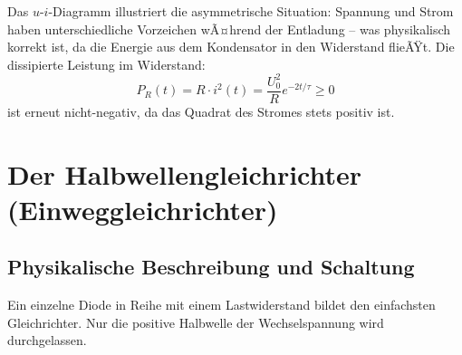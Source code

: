 ﻿\documentclass[12pt, a4paper]{article}
\begin{document}
	Das $u$-$i$-Diagramm illustriert die asymmetrische Situation: Spannung und Strom haben unterschiedliche Vorzeichen wÃ¤hrend der Entladung -- was physikalisch korrekt ist, da die Energie aus dem Kondensator in den Widerstand flieÃŸt. Die dissipierte Leistung im Widerstand:
	\begin{equation}
		P_R(t) = R \cdot i^2(t) = \frac{U_0^2}{R} e^{-2t/\tau} \geq 0
	\end{equation}
	ist erneut nicht-negativ, da das Quadrat des Stromes stets positiv ist.
	
	\section{Der Halbwellengleichrichter (Einweggleichrichter)}
	
	\subsection{Physikalische Beschreibung und Schaltung}
	
	Ein einzelne Diode in Reihe mit einem Lastwiderstand bildet den einfachsten Gleichrichter. Nur die positive Halbwelle der Wechselspannung wird durchgelassen.
	
\end{document}
